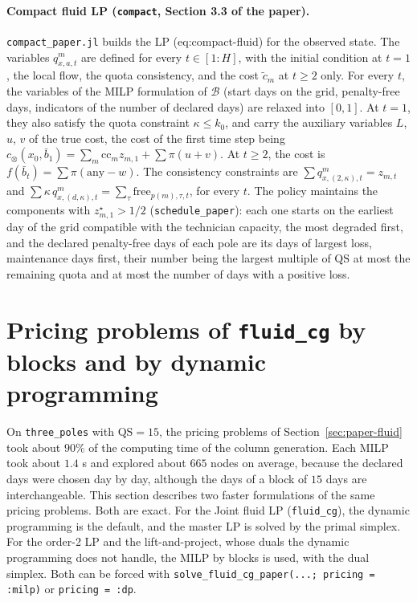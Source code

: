 \documentclass[11pt]{article}
\newcommand{\free}{\mathrm{free}}
\begin{document}
\paragraph{Compact fluid LP (\texttt{compact}, Section 3.3 of the paper).}
\texttt{compact\_paper.jl} builds the LP (eq:compact-fluid) for the observed state. The variables
$q^m_{x,a,t}$ are defined for every $t \in [1:H]$, with the initial condition at $t = 1$, the
local flow, the quota consistency, and the cost $\tilde c_m$ at $t \ge 2$ only. For every $t$,
the variables of the MILP formulation of $\mathcal B$ (start days on the grid, penalty-free days,
indicators of the number of declared days) are relaxed into $[0,1]$. At $t = 1$, they also
satisfy the quota constraint $\kappa \le k_0$, and carry the auxiliary variables $L$, $u$, $v$ of
the true cost, the cost of the first time step being $c_\otimes(x_0, \bar b_1) = \sum_m
\mathrm{cc}_m z_{m,1} + \sum \pi (u + v)$. At $t \ge 2$, the cost is $f(\bar b_t) = \sum \pi
(\mathrm{any} - w)$. The consistency constraints are $\sum q^m_{x,(2,\kappa),t} = z_{m,t}$ and
$\sum \kappa\, q^m_{x,(d,\kappa),t} = \sum_\tau \free_{p(m),\tau,t}$, for every $t$. The policy
maintains the components with $z_{m,1}^\star > 1/2$ (\texttt{schedule\_paper}): each one starts
on the earliest day of the grid compatible with the technician capacity, the most degraded first,
and the declared penalty-free days of each pole are its days of largest loss, maintenance days
first, their number being the largest multiple of $\mathrm{QS}$ at most the remaining quota and at
most the number of days with a positive loss.

\section{Pricing problems of \texttt{fluid\_cg} by blocks and by dynamic programming}
\label{sec:pricing-dp}

On \texttt{three\_poles} with $\mathrm{QS} = 15$, the pricing problems of
Section~\ref{sec:paper-fluid} took about $90\%$ of the computing time of the column generation.
Each MILP took about $1.4$ s and explored about $665$ nodes on average, because the declared days
were chosen day by day, although the days of a block of $15$ days are interchangeable. This
section describes two faster formulations of the same pricing problems. Both are exact. For the
Joint fluid LP (\texttt{fluid\_cg}), the dynamic programming is the default, and the master LP is
solved by the primal simplex. For the order-2 LP and the lift-and-project, whose duals the dynamic
programming does not handle, the MILP by blocks is used, with the dual simplex. Both can be forced
with \texttt{solve\_fluid\_cg\_paper(...; pricing = :milp)} or \texttt{pricing = :dp}.
\end{document}
